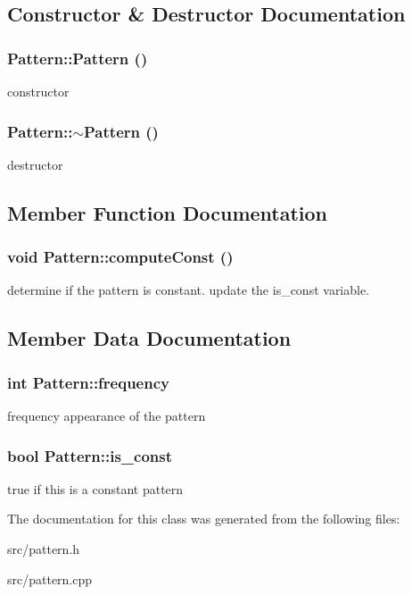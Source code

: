 \subsection{Constructor \& Destructor Documentation}
\hypertarget{classPattern_a95f42b0f1717d9e6c2d831e87d27f83c}{
\subsubsection[{Pattern}]{\setlength{\rightskip}{0pt plus 5cm}Pattern::Pattern ()}}
\label{classPattern_a95f42b0f1717d9e6c2d831e87d27f83c}
constructor \hypertarget{classPattern_a6e8b9388bbd39934e9f9534b974d7498}{
\subsubsection[{$\sim$Pattern}]{\setlength{\rightskip}{0pt plus 5cm}Pattern::$\sim$Pattern ()}}
\label{classPattern_a6e8b9388bbd39934e9f9534b974d7498}
destructor 

\subsection{Member Function Documentation}
\hypertarget{classPattern_a59d62a45aa4541a8fe378bae9b25b9af}{
\subsubsection[{computeConst}]{\setlength{\rightskip}{0pt plus 5cm}void Pattern::computeConst ()}}
\label{classPattern_a59d62a45aa4541a8fe378bae9b25b9af}
determine if the pattern is constant. update the is\_\-const variable. 

\subsection{Member Data Documentation}
\hypertarget{classPattern_aa7c284ee648d82461922d6c1d6214631}{
\subsubsection[{frequency}]{\setlength{\rightskip}{0pt plus 5cm}int {\bf Pattern::frequency}}}
\label{classPattern_aa7c284ee648d82461922d6c1d6214631}
frequency appearance of the pattern \hypertarget{classPattern_af6375248ff24797d1e0e8177a98c93b8}{
\subsubsection[{is\_\-const}]{\setlength{\rightskip}{0pt plus 5cm}bool {\bf Pattern::is\_\-const}}}
\label{classPattern_af6375248ff24797d1e0e8177a98c93b8}
true if this is a constant pattern 

The documentation for this class was generated from the following files:\begin{DoxyCompactItemize}
\item 
src/pattern.h\item 
src/pattern.cpp\end{DoxyCompactItemize}
